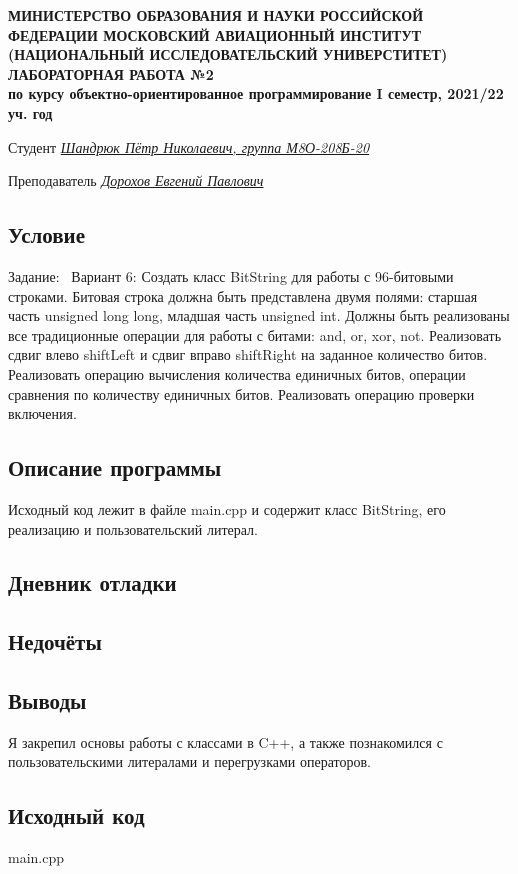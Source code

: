 \documentclass[12pt]{article}
\begin{document}
\begin{titlepage}
\begin{center}
\textbf{МИНИСТЕРСТВО ОБРАЗОВАНИЯ И НАУКИ РОССИЙСКОЙ ФЕДЕРАЦИИ
\medskip
МОСКОВСКИЙ АВИАЦИОННЫЙ ИНСТИТУТ
(НАЦИОНАЛЬНЫЙ ИССЛЕДОВАТЕЛЬСКИЙ УНИВЕРСТИТЕТ)
\vfill\vfill
{\Huge ЛАБОРАТОРНАЯ РАБОТА №2} \\
по курсу объектно-ориентированное программирование
I семестр, 2021/22 уч. год}
\end{center}
\vfill

Студент \uline{\it {Шандрюк Пётр Николаевич, группа М8О-208Б-20}\hfill}

Преподаватель \uline{\it {Дорохов Евгений Павлович}\hfill}

\vfill
\end{titlepage}

\subsection*{Условие}

Задание: \
Вариант 6: Создать класс BitString для работы с 96-битовыми строками. Битовая
строка должна быть представлена двумя полями: старшая часть unsigned
long long, младшая часть unsigned int. Должны быть реализованы все
традиционные операции для работы с битами: and, or, xor, not. Реализовать
сдвиг влево shiftLeft и сдвиг вправо shiftRight на заданное количество битов.
Реализовать операцию вычисления количества единичных битов, операции
сравнения по количеству единичных битов. Реализовать операцию проверки
включения.

\subsection*{Описание программы}

Исходный код лежит в файле main.cpp и содержит класс BitString, его реализацию и пользовательский литерал.


\subsection*{Дневник отладки}


\subsection*{Недочёты}


\subsection*{Выводы}

Я закрепил основы работы с классами в C++, а также познакомился с пользовательскими литералами и перегрузками операторов.


\vfill

\subsection*{Исходный код}

    
{\Huge main.cpp}
\inputminted{C++}{main.cpp}
    \pagebreak
    
\end{document}

